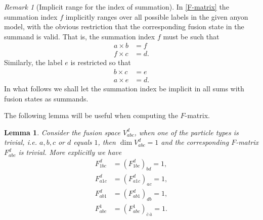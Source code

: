 \documentclass[a4paper,10pt,oneside]{book}
\theoremstyle{plain}
\newtheorem{lemma}[theorem]{Lemma}
\theoremstyle{definition}
\theoremstyle{remark}
\newtheorem{remark}{Remark}[section]
\begin{document}
\begin{remark}[Implicit range for the index of summation]\label{rem:sum index range}
  In \cref{F-matrix} the summation index $f$ implicitly ranges over all possible labels in the given anyon model, with the obvious restriction that the corresponding fusion state in the summand is valid. That is, the summation index $f$ must be such that
  \begin{align*}
    a \times b &= f \\
    f \times c &= d.
  \end{align*}
  Similarly, the label $e$ is restricted so that
  \begin{align*}
    b \times c &= e \\
    a \times e &= d.
  \end{align*}
  In what follows we shall let the summation index be implicit in all sums with fusion states as summands.
\end{remark}

The following lemma will be useful when computing the $F$-matrix.

\begin{lemma}\label{res:F1}
  Consider the fusion space $V_{abc}^d$, when one of the particle types is trivial, i.e. $a,b,c$ or $d$ equals $1$, then $\dim V_{abc}^d = 1$ and the corresponding $F$-matrix $F_{abc}^d$ is trivial. More explicitly we have
  \begin{align*}
    F_{1bc}^d &= \left( F_{1bc}^d \right)_{bd} = 1, \\
    F_{a1c}^d &= \left( F_{a1c}^d \right)_{ac} = 1, \\
    F_{ab1}^d &= \left( F_{ab1}^d \right)_{db} = 1, \\
    F_{abc}^1 &= \left( F_{abc}^1 \right)_{\overline{c}\,\overline{a}} = 1.
  \end{align*}
\end{lemma}
\end{document}
